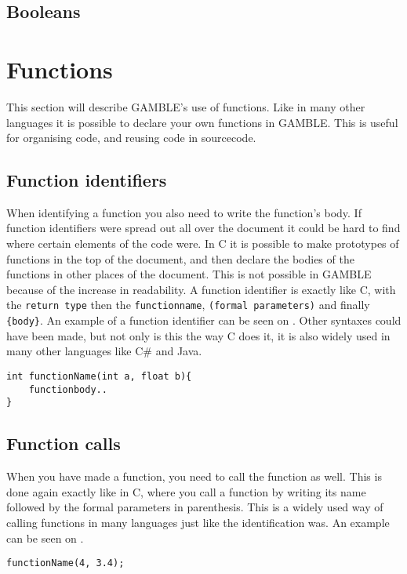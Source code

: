 \subsection{Booleans}

\section{Functions}
This section will describe GAMBLE's use of functions. 
Like in many other languages it is possible to declare your own functions in GAMBLE.
This is useful for organising code, and reusing code in sourcecode.

\subsection{Function identifiers}
When identifying a function you also need to write the function's body.
If function identifiers were spread out all over the document it could be hard to find where certain elements of the code were.
In C it is possible to make prototypes of functions in the top of the document, and then declare the bodies of the functions in other places of the document. 
This is not possible in GAMBLE because of the increase in readability.
A function identifier is exactly like C, with the \texttt{return type} then the \texttt{functionname}, \texttt{(formal parameters)} and finally \texttt{\{body\}}.
An example of a function identifier can be seen on .
Other syntaxes could have been made, but not only is this the way C does it, it is also widely used in many other languages like C\# and Java.


\begin{lstlisting}[label=functionID]
int functionName(int a, float b){
	functionbody..
}
\end{lstlisting}

\subsection{Function calls}
When you have made a function, you need to call the function as well.
This is done again exactly like in C, where you call a function by writing its name followed by the formal parameters in parenthesis.
This is a widely used way of calling functions in many languages just like the identification was.
An example can be seen on .

\begin{lstlisting}[label=functionCall]
functionName(4, 3.4);
\end{lstlisting}


